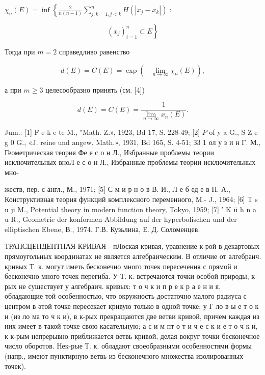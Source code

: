 \documentclass[10pt]{article}
\begin{document}
$\chi_{n}(E)=\inf \left\{\frac{2}{n(n-1)} \sum_{j, k=1, j<k}^{n} H\left(\left|x_{j}-x_{k}\right|\right)\right.$ :



\[

\left.\left(x_{j}\right)_{i=1}^{n} \subset E\right\}

\]



Тогда при $m=2$ справедливо равенство



\[

d(E)=C(E)=\exp \left(-\lim _{n \rightarrow \infty} \chi_{n}(E)\right),

\]



а при $m \geqslant 3$ целесообразно принять (см. [4])



\[

d(E)=C(E)=\frac{1}{\lim _{n \rightarrow \infty} x_{n}(E)} .

\]



Jum.: [1] F e k e te M., "Math. Z.», 1923, Bd 17, S. 228-49; [2] $P$ of y a G., S $\mathrm{Z}$ e g 0 G., «J. reine und angew. Math.», 1931, Bd 165, S. 4-51; З3 1 ол у з и н Г. М., Геометрическая теория Фе е с о н Л., Избранные проблемы теории исключительных вноЛ е с о н Л., Избранные проблемы теории исключительных мно-

жеств, пер. с англ., М., 1971; [5] С м и р н о в В. И., Л е б ед е в Н. А., Конструктивная теория функций комплексного переменного, M.- J., 1964; [6] T s u ji M., Potential theory in modern function theory, Tokyo, 1959; [7] ' $\mathrm{K}$ ü h $\mathrm{n}$ a u R., Geometrie der konformen Abbildung auf der hyperbolischen und der elliptischen Ebene, В., 1974. Г.В. Кузьлина, Е. Д. Соломенцев.



ТРАНСЦЕНДЕНТНАЯ КРИВАЯ - пЛоская кривая, уравнение к-рой в декартовых прямоугольных координатах не является алгебраическим. В отличие от алгебраич. кривых Т. к. могут иметь бесконечно много точек пересечения с прямой и бесконечно много точек перегиба. У Т. к. встречаются точки особой природы, к-рых не существует у алгебраич. кривых: т о ч к и п р е к р а е н и я, обладающие той особенностью, что окружность достаточно малого радиуса с центром в әтой точке пересекает кривую только в одной точке; у Г ло в ы е т о к и (из ло ма то ч к и), в к-рых прекращаются две ветви кривой, причем каждая из них имеет в такой точке свою касательную; а с и м пт о т и ч е с к и е т о ч к и, к к-рым непрерывно приближается ветвь кривой, делая вокруг точки бесконечное число оборотов. Нек-рые Т. к. обладают своеобразными особенностями формы (напр., имеют пунктирную ветвь из бесконечного множества изолированных точек).
\end{document}
